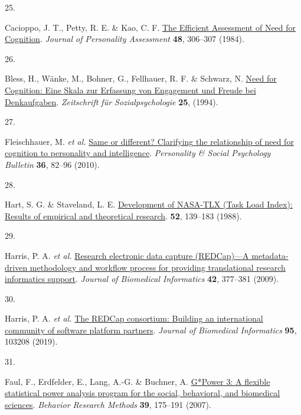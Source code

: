 \documentclass[
  man,floatsintext]{apa6}
\newlength{\cslhangindent}
\newlength{\csllabelwidth}
\newlength{\cslentryspacingunit} %
\newenvironment{CSLReferences}[2] %
 {%
  \setlength{\parindent}{0pt}
  \ifodd #1
  \let\oldpar\par
  \def\par{\hangindent=\cslhangindent\oldpar}
  \fi
  \setlength{\parskip}{#2\cslentryspacingunit}
 }%
 {}
\newcommand{\CSLLeftMargin}[1]{\parbox[t]{\csllabelwidth}{#1}}
\newcommand{\CSLRightInline}[1]{\parbox[t]{\linewidth - \csllabelwidth}{#1}\break}
\begin{document}
\begin{CSLReferences}{0}{0}
\leavevmode{}%
\CSLLeftMargin{25. }%
\CSLRightInline{Cacioppo, J. T., Petty, R. E. \& Kao, C. F. \href{https://doi.org/10.1207/s15327752jpa4803_13}{The {Efficient} {Assessment} of {Need} for {Cognition}}. \emph{Journal of Personality Assessment} \textbf{48}, 306--307 (1984).}

\leavevmode{}%
\CSLLeftMargin{26. }%
\CSLRightInline{Bless, H., Wänke, M., Bohner, G., Fellhauer, R. F. \& Schwarz, N. \href{https://doi.org/1779110}{Need for {Cognition}: {Eine} {Skala} zur {Erfassung} von {Engagement} und {Freude} bei {Denkaufgaben}}. \emph{Zeitschrift für Sozialpsychologie} \textbf{25}, (1994).}

\leavevmode{}%
\CSLLeftMargin{27. }%
\CSLRightInline{Fleischhauer, M. \emph{et al.} \href{https://doi.org/10.1177/0146167209351886}{Same or different? {Clarifying} the relationship of need for cognition to personality and intelligence}. \emph{Personality \& Social Psychology Bulletin} \textbf{36}, 82--96 (2010).}

\leavevmode{}%
\CSLLeftMargin{28. }%
\CSLRightInline{Hart, S. G. \& Staveland, L. E. \href{https://doi.org/10.1016/S0166-4115(08)62386-9}{Development of {NASA}-{TLX} ({Task} {Load} {Index}): {Results} of empirical and theoretical research}. \textbf{52}, 139--183 (1988).}

\leavevmode{}%
\CSLLeftMargin{29. }%
\CSLRightInline{Harris, P. A. \emph{et al.} \href{https://doi.org/10.1016/j.jbi.2008.08.010}{Research electronic data capture ({REDCap})---{A} metadata-driven methodology and workflow process for providing translational research informatics support}. \emph{Journal of Biomedical Informatics} \textbf{42}, 377--381 (2009).}

\leavevmode{}%
\CSLLeftMargin{30. }%
\CSLRightInline{Harris, P. A. \emph{et al.} \href{https://doi.org/10.1016/j.jbi.2019.103208}{The {REDCap} consortium: {Building} an international community of software platform partners}. \emph{Journal of Biomedical Informatics} \textbf{95}, 103208 (2019).}

\leavevmode{}%
\CSLLeftMargin{31. }%
\CSLRightInline{Faul, F., Erdfelder, E., Lang, A.-G. \& Buchner, A. \href{https://doi.org/10.3758/BF03193146}{G*{Power} 3: {A} flexible statistical power analysis program for the social, behavioral, and biomedical sciences}. \emph{Behavior Research Methods} \textbf{39}, 175--191 (2007).}


\end{CSLReferences}
\end{document}
